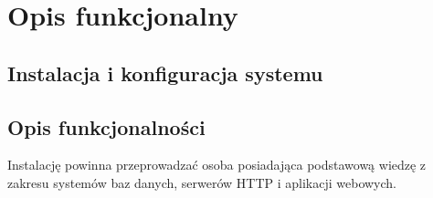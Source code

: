 \documentclass{report}
\begin{document}
\chapter{Opis funkcjonalny}

	\section{Instalacja i konfiguracja systemu}
	
	\section{Opis funkcjonalności}

Instalację powinna przeprowadzać osoba posiadająca podstawową wiedzę z zakresu systemów baz danych, serwerów HTTP i aplikacji webowych.
\end{document}
